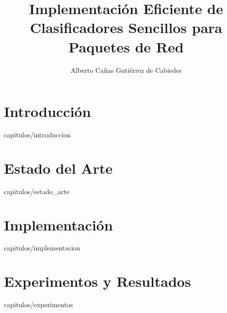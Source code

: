 \documentclass[final, epsbased]{tfgtfmthesisuam}
\title{Implementación Eficiente de Clasificadores Sencillos para Paquetes de Red}
\author{Alberto Cañas Gutiérrez de Cabiedes}
\begin{document}
\chapter{Introducción}{capitulos/introduccion}
\chapter{Estado del Arte}{capitulos/estado_arte}
\chapter{Implementación}{capitulos/implementacion}
\chapter{Experimentos y Resultados}{capitulos/experimentos}
\printglossary


\end{document}
